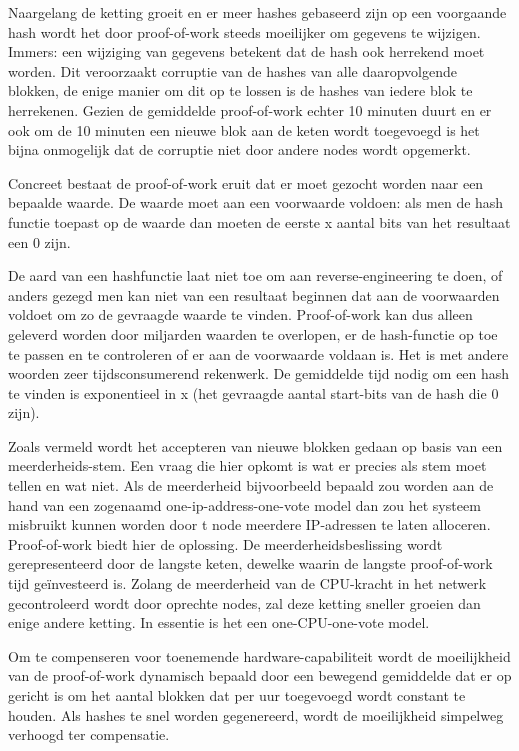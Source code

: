 	Naargelang de ketting groeit en er meer hashes gebaseerd zijn op een voorgaande hash wordt het door proof-of-work steeds moeilijker om gegevens te wijzigen. Immers: een wijziging van gegevens betekent dat de hash ook herrekend moet worden. Dit veroorzaakt corruptie van de hashes van alle daaropvolgende blokken, de enige manier om dit op te lossen is de hashes van iedere blok te herrekenen. 
	Gezien de gemiddelde proof-of-work echter 10 minuten duurt en er ook om de 10 minuten een nieuwe blok aan de keten wordt toegevoegd is het bijna onmogelijk dat de corruptie niet door andere nodes wordt opgemerkt.
	
	Concreet bestaat de proof-of-work eruit dat er moet gezocht worden naar een bepaalde waarde. De waarde moet aan een voorwaarde voldoen: als men de hash functie toepast op de waarde dan moeten de eerste x aantal bits van het resultaat een 0 zijn. 
	
	De aard van een hashfunctie laat niet toe om aan reverse-engineering te doen, of anders gezegd men kan niet van een resultaat beginnen dat aan de voorwaarden voldoet om zo de gevraagde waarde te vinden. Proof-of-work kan dus alleen geleverd worden door miljarden waarden te overlopen, er de hash-functie op toe te passen en te controleren of er aan de voorwaarde voldaan is. Het is met andere woorden zeer tijdsconsumerend rekenwerk. De gemiddelde tijd nodig om een hash te vinden is exponentieel in x (het gevraagde aantal start-bits van de hash die 0 zijn).
	
	Zoals vermeld wordt het accepteren van nieuwe blokken gedaan op basis van een meerderheids-stem. Een vraag die hier opkomt is wat er precies als stem moet tellen en wat niet. Als de meerderheid bijvoorbeeld bepaald zou worden aan de hand van een zogenaamd one-ip-address-one-vote model dan zou het systeem misbruikt kunnen worden door t node meerdere IP-adressen te laten alloceren. Proof-of-work biedt hier de oplossing. De meerderheidsbeslissing wordt gerepresenteerd door de langste keten, dewelke waarin de langste proof-of-work tijd geïnvesteerd is. Zolang de meerderheid van de CPU-kracht in het netwerk gecontroleerd wordt door oprechte nodes, zal deze ketting sneller groeien dan enige andere ketting. In essentie is het een one-CPU-one-vote model.
	
	Om te compenseren voor toenemende hardware-capabiliteit wordt de moeilijkheid van de proof-of-work dynamisch bepaald door een bewegend gemiddelde dat er op gericht is om het aantal blokken dat per uur toegevoegd wordt constant te houden. Als hashes te snel worden gegenereerd, wordt de moeilijkheid simpelweg verhoogd ter compensatie. 
